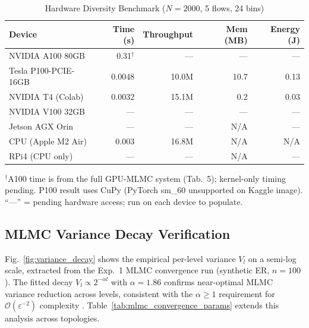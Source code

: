 \documentclass{ieeeaccess}
\begin{document}
\begin{table}[!t]
\caption{Hardware Diversity Benchmark ($N{=}2000$, 5 flows, 24 bins)}
\label{tab:hardware_diversity}
\centering\small
\begin{tabular}{lrrrr}
\toprule
Device & Time (s) & Throughput & Mem (MB) & Energy (J) \\
\midrule
NVIDIA A100 80GB & 0.31$^\dagger$ & --- & --- & --- \\
Tesla P100-PCIE-16GB & 0.0048 & 10.0M & 10.7 & 0.13 \\
NVIDIA T4 (Colab) & 0.0032 & 15.1M & 0.2 & 0.03 \\
NVIDIA V100 32GB & --- & --- & --- & --- \\
Jetson AGX Orin & --- & --- & N/A & --- \\
CPU (Apple M2 Air) & 0.003 & 16.8M & N/A & N/A \\
RPi4 (CPU only)  & --- & --- & N/A & --- \\
\bottomrule
\end{tabular}
\begin{minipage}{0.95\columnwidth}
\footnotesize{$^\dagger$A100 time is from the full GPU-MLMC system (Tab.~5); kernel-only
timing pending. P100 result uses CuPy (PyTorch sm\_60 unsupported on Kaggle image).
``---'' = pending hardware access; run  on each device to populate.}
\end{minipage}
\end{table}

\subsection{MLMC Variance Decay Verification}

Fig.~\ref{fig:variance_decay} shows the empirical per-level variance $V_l$ on a semi-log scale,
extracted from the Exp.~1 MLMC convergence run (synthetic ER, $n=100$). The fitted decay
$V_l \propto 2^{-\alpha l}$ with $\alpha=1.86$ confirms near-optimal MLMC variance reduction
across levels, consistent with the $\alpha \geq 1$ requirement for $\mathcal{O}(\varepsilon^{-2})$
complexity \cite{giles2015multilevel}. Table~\ref{tab:mlmc_convergence_params} extends this
analysis across topologies.
\end{document}

